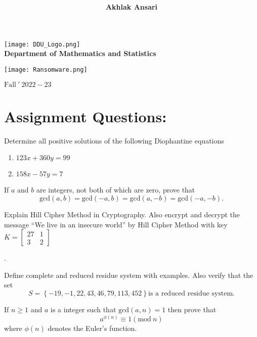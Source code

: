 \documentclass[a4paper,12pt]{article}
\title{\underline {\sc {\textbf ASSIGNMENT: NUMBER THEORY}}}
\author{\textbf{Akhlak Ansari}}
\begin{document}
    \pgfplotsset{compat=1.17}
    \color{black}

    \maketitle 

         
    
    \begin{center}
      
        \texttt{[image: DDU\_Logo.png]}\\[3mm]
        \textbf{ {\LARGE Department of Mathematics and Statistics}}
    \end{center}

    \vspace*{0.7cm}
    \begin{center}
        \texttt{[image: Ransomware.png]}
    \end{center}

    \begin{center}
        \textbf{$\mbox{Fall}\ '\ 2022-23$ }
    \end{center}

    

    \section*{Assignment Questions:}
    \begin{enumerate}
        {\large \item   Determine all positive solutions of the following Diophantine equations 
        \begin{enumerate}
            \item $123x + 360y = 99$
            \item $158x -57y = 7$
        \end{enumerate}}

        {\large \item  If $a$ and $b$ are integers, not both of which are zero, prove that 
        $$\mbox{gcd}(a,b) = \mbox{gcd}(-a,b) = \mbox{gcd}(a,-b) = \mbox{gcd}(-a,-b).$$}

        {\large \item Explain Hill Cipher Method in Cryptography. Also encrypt and decrypt the message “We live in an insecure world” by Hill Cipher Method with key\ $ K = \begin{bmatrix}
                27 & 1 \\
                3 & 2
              \end{bmatrix}$}.

        {\large \item Define complete and reduced residue system with examples. Also verify that the set 
        $$S = \left\{-19, -1, 22, 43, 46, 79, 113, 452\right\}  \mbox{is a reduced residue system}.$$}
        {\large \item If $n \geq 1$ and $a$ is a integer such that $\mbox{gcd}(a, n) = 1$ then prove that
        $$a^{\phi(n)} \equiv 1(\mbox{mod}\  n)$$
        where $\phi(n)$ denotes the Euler's function.}
    \end{enumerate}
\end{document}
